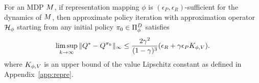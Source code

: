 \begin{theorem}
\label{thm:model_learn_error}
For an MDP $M$, if representation mapping $\phi$ is $(\epsilon_P,\epsilon_R)$-sufficient for the dynamics of $M$,
then approximate policy iteration with approximation operator $\mathcal{H}_{\phi}$ starting from any initial policy $\pi_0\in\Pi_{\phi}^D$ satisfies 
\vspace{-0.5em}
\begin{equation}
    \limsup_{k\to\infty} \|Q^* - Q^{\pi_k} \|_{\infty} \leq \frac{2\gamma^2}{(1-\gamma)^3}(\epsilon_R+\gamma\epsilon_PK_{\phi,V}).
\end{equation}
where $K_{\phi,V}$ is an upper bound of the value Lipschitz constant as defined in Appendix~\ref{app:repre}.
\end{theorem}

